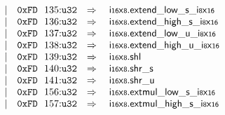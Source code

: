 $$\begin{array}[t]{@{}lrrl@{}l@{}l@{}l@{}}
& & | & \mathtt{0xFD}~~135{:}{\mathtt{u32}} & \quad\Rightarrow\quad{} & {\mathsf{i{\scriptstyle 16}}}{\mathsf{x}}{\mathsf{{\scriptstyle 8}}} {.} {{\mathsf{extend}}{\mathsf{\_}}{\mathsf{low}}{\mathsf{\_}}{\mathsf{s}}}{\mathsf{\_}}{{\mathsf{i{\scriptstyle 8}}}{\mathsf{x}}{\mathsf{{\scriptstyle 16}}}} \\
& & | & \mathtt{0xFD}~~136{:}{\mathtt{u32}} & \quad\Rightarrow\quad{} & {\mathsf{i{\scriptstyle 16}}}{\mathsf{x}}{\mathsf{{\scriptstyle 8}}} {.} {{\mathsf{extend}}{\mathsf{\_}}{\mathsf{high}}{\mathsf{\_}}{\mathsf{s}}}{\mathsf{\_}}{{\mathsf{i{\scriptstyle 8}}}{\mathsf{x}}{\mathsf{{\scriptstyle 16}}}} \\
& & | & \mathtt{0xFD}~~137{:}{\mathtt{u32}} & \quad\Rightarrow\quad{} & {\mathsf{i{\scriptstyle 16}}}{\mathsf{x}}{\mathsf{{\scriptstyle 8}}} {.} {{\mathsf{extend}}{\mathsf{\_}}{\mathsf{low}}{\mathsf{\_}}{\mathsf{u}}}{\mathsf{\_}}{{\mathsf{i{\scriptstyle 8}}}{\mathsf{x}}{\mathsf{{\scriptstyle 16}}}} \\
& & | & \mathtt{0xFD}~~138{:}{\mathtt{u32}} & \quad\Rightarrow\quad{} & {\mathsf{i{\scriptstyle 16}}}{\mathsf{x}}{\mathsf{{\scriptstyle 8}}} {.} {{\mathsf{extend}}{\mathsf{\_}}{\mathsf{high}}{\mathsf{\_}}{\mathsf{u}}}{\mathsf{\_}}{{\mathsf{i{\scriptstyle 8}}}{\mathsf{x}}{\mathsf{{\scriptstyle 16}}}} \\
& & | & \mathtt{0xFD}~~139{:}{\mathtt{u32}} & \quad\Rightarrow\quad{} & {\mathsf{i{\scriptstyle 16}}}{\mathsf{x}}{\mathsf{{\scriptstyle 8}}} {.} \mathsf{shl} \\
& & | & \mathtt{0xFD}~~140{:}{\mathtt{u32}} & \quad\Rightarrow\quad{} & {\mathsf{i{\scriptstyle 16}}}{\mathsf{x}}{\mathsf{{\scriptstyle 8}}} {.} {\mathsf{shr}}{\mathsf{\_}}{\mathsf{s}} \\
& & | & \mathtt{0xFD}~~141{:}{\mathtt{u32}} & \quad\Rightarrow\quad{} & {\mathsf{i{\scriptstyle 16}}}{\mathsf{x}}{\mathsf{{\scriptstyle 8}}} {.} {\mathsf{shr}}{\mathsf{\_}}{\mathsf{u}} \\
& & | & \mathtt{0xFD}~~156{:}{\mathtt{u32}} & \quad\Rightarrow\quad{} & {\mathsf{i{\scriptstyle 16}}}{\mathsf{x}}{\mathsf{{\scriptstyle 8}}} {.} {{\mathsf{extmul}}{\mathsf{\_}}{\mathsf{low}}{\mathsf{\_}}{\mathsf{s}}}{\mathsf{\_}}{{\mathsf{i{\scriptstyle 8}}}{\mathsf{x}}{\mathsf{{\scriptstyle 16}}}} \\
& & | & \mathtt{0xFD}~~157{:}{\mathtt{u32}} & \quad\Rightarrow\quad{} & {\mathsf{i{\scriptstyle 16}}}{\mathsf{x}}{\mathsf{{\scriptstyle 8}}} {.} {{\mathsf{extmul}}{\mathsf{\_}}{\mathsf{high}}{\mathsf{\_}}{\mathsf{s}}}{\mathsf{\_}}{{\mathsf{i{\scriptstyle 8}}}{\mathsf{x}}{\mathsf{{\scriptstyle 16}}}} \\

\end{array}$$
